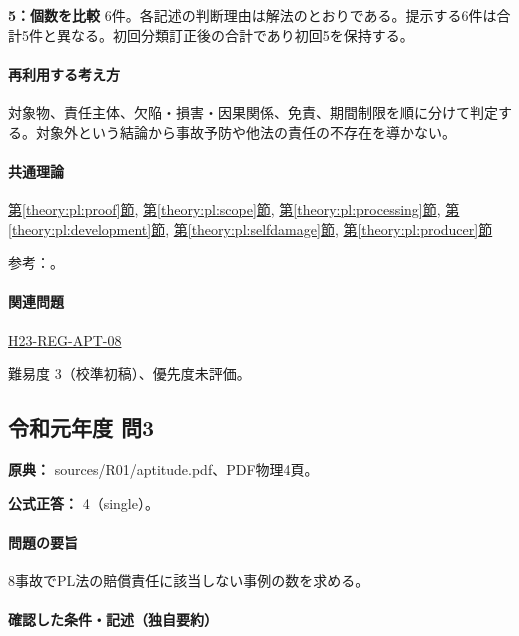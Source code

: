\noindent\textbf{5：個数を比較} 6件。各記述の判断理由は解法のとおりである。提示する6件は合計5件と異なる。初回分類訂正後の合計であり初回5を保持する。\par

\paragraph{再利用する考え方} 対象物、責任主体、欠陥・損害・因果関係、免責、期間制限を順に分けて判定する。対象外という結論から事故予防や他法の責任の不存在を導かない。

\paragraph{共通理論} \hyperref[theory:pl:proof]{第\ref*{theory:pl:proof}節}, \hyperref[theory:pl:scope]{第\ref*{theory:pl:scope}節}, \hyperref[theory:pl:processing]{第\ref*{theory:pl:processing}節}, \hyperref[theory:pl:development]{第\ref*{theory:pl:development}節}, \hyperref[theory:pl:selfdamage]{第\ref*{theory:pl:selfdamage}節}, \hyperref[theory:pl:producer]{第\ref*{theory:pl:producer}節}

\par 参考：\cite{pl_statute,pl_qa,pl_definitions2018}。

\paragraph{関連問題} \hyperref[q:h23-reg-apt-08]{H23-REG-APT-08}

\par 難易度 3（校準初稿）、優先度未評価。

\subsection{令和元年度 問3}
\label{q:r01-reg-apt-03}

\noindent\textbf{原典：} sources/R01/aptitude.pdf、PDF物理4頁。

\textbf{公式正答：} 4（single）。

\paragraph{問題の要旨} 8事故でPL法の賠償責任に該当しない事例の数を求める。

\paragraph{確認した条件・記述（独自要約）}\mbox{}\par

